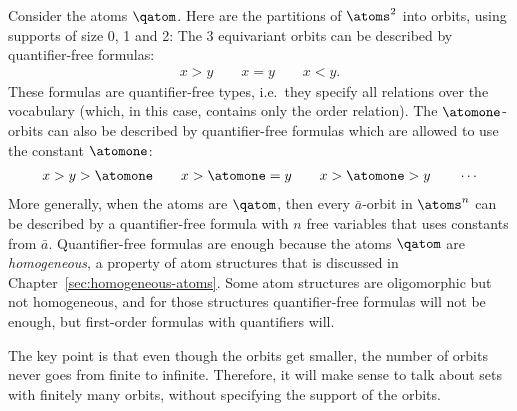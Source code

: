 \begin{myexample}\label{ex:three-finiteness-types}
	Consider the atoms $\qatom$. Here are the partitions of $\atoms^2$ into orbits, using supports of size 0, 1 and 2:
	The 3 equivariant orbits can be described by quantifier-free formulas:
	\begin{align*}
		x > y \qquad x = y \qquad x < y.
	\end{align*}
	These formulas are quantifier-free types, i.e.~they specify all relations over the vocabulary (which, in this case, contains only the order relation). The $\atomone$-orbits can also be described by quantifier-free formulas which are allowed to use the constant $\atomone$:
	\begin{align*}
		x > y > \atomone \qquad x > \atomone = y \qquad x > \atomone > y \qquad \cdots
	\end{align*}
	More generally, when the atoms are $\qatom$, then every $\bar a$-orbit in $\atoms^n$ can be described by a quantifier-free formula with $n$ free variables that uses constants from $\bar a$. Quantifier-free formulas are enough because the atoms $\qatom$ are \emph{homogeneous}, a property of atom structures that is discussed in Chapter~\ref{sec:homogeneous-atoms}. Some atom structures are oligomorphic but not homogeneous, and for those structures quantifier-free formulas will not be enough, but first-order formulas with quantifiers will.
\end{myexample} 

The key point is that even though the orbits get smaller, the number of orbits never goes from finite to infinite. Therefore, it will make sense to talk about sets with finitely many orbits, without specifying the support of the orbits.

